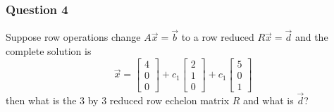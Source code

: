 \documentclass{math}
\begin{document}
\subsubsection*{Question 4}
Suppose row operations change \( A\vec{x} = \vec{b} \) to a row reduced
\( R\vec{x} = \vec{d} \) and the complete solution is
\[ \vec{x} = \begin{bmatrix}4 \\ 0 \\ 0\end{bmatrix}+
  c_1\begin{bmatrix}2 \\ 1 \\ 0\end{bmatrix}+
  c_1\begin{bmatrix}5 \\ 0 \\ 1\end{bmatrix} \]
then what is the 3 by 3 reduced row echelon matrix \( R \) and what is
\( \vec{d} \)?
\end{document}
